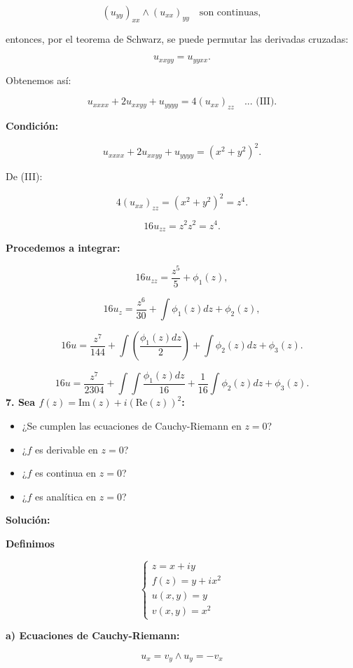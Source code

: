 \documentclass[a4paper,12pt]{article}
\begin{document}
\[
(u_{yy})_{xx} \wedge (u_{xx})_{yy} \quad \text{son continuas},
\]

entonces, por el teorema de Schwarz, se puede permutar las derivadas cruzadas:

\[
u_{xxyy} = u_{yyxx}.
\]

Obtenemos así:

\[
u_{xxxx} + 2u_{xxyy} + u_{yyyy} = 4(u_{xx})_{zz} \quad \text{... (III)}.
\]

\textbf{Condición:}

\[
u_{xxxx} + 2u_{xxyy} + u_{yyyy} = (x^2 + y^2)^2.
\]

De (III):

\[
4(u_{xx})_{zz} = (x^2 + y^2)^2 = z^4.
\]

\[
16u_{zz} = z^2 z^2 = z^4.
\]

\textbf{Procedemos a integrar:}

\[
16u_{zz} = \frac{z^5}{5} + \phi_1(z),
\]

\[
16u_z = \frac{z^6}{30} + \int \phi_1(z) dz + \phi_2(z),
\]

\[
16u = \frac{z^7}{144} + \int \left( \frac{\phi_1(z) dz}{2} \right) + \int \phi_2(z) dz + \phi_3(z).
\]

\[
16u = \frac{z^7}{2304} + \int \int \frac{\phi_1(z) dz}{16} + \frac{1}{16} \int \phi_2(z) dz + \phi_3(z).
\]
\textbf{7. Sea \(f(z) = \text{Im}(z) + i(\text{Re}(z))^2\):}

\begin{itemize}
    \item[a)] ¿Se cumplen las ecuaciones de Cauchy-Riemann en \(z = 0\)?
    \item[b)] ¿\(f\) es derivable en \(z = 0\)?
    \item[c)] ¿\(f\) es continua en \(z = 0\)?
    \item[d)] ¿\(f\) es analítica en \(z = 0\)?
\end{itemize}

\textbf{Solución:}

\textbf{Definimos}

\[
\begin{cases}
z = x + iy \\
f(z) = y + ix^2 \\
u(x, y) = y \\
v(x, y) = x^2
\end{cases}
\]

\textbf{a) Ecuaciones de Cauchy-Riemann:}

\[
u_x = v_y \wedge u_y = -v_x
\]
\end{document}
